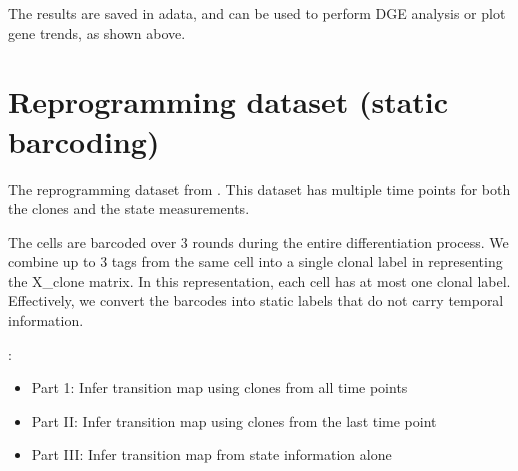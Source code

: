 \documentclass[letterpaper,10pt,english]{sphinxmanual}
\begin{document}
The results are saved in adata, and can be used to perform DGE analysis or plot gene trends, as shown above.


\section{Reprogramming dataset (static barcoding)}
\label{\detokenize{20210121_reprogramming_data_merge_tags:Reprogramming-dataset-(static-barcoding)}}\label{\detokenize{20210121_reprogramming_data_merge_tags::doc}}
The reprogramming dataset from . This dataset has multiple time points for both the clones and the state measurements.

The cells are barcoded over 3 rounds during the entire differentiation process. We combine up to 3 tags from the same cell into a single clonal label in representing the X\_clone matrix. In this representation, each cell has at most one clonal label. Effectively, we convert the barcodes into static labels that do not carry temporal information.

:
\begin{itemize}
\item {} 
Part 1: Infer transition map using clones from all time points

\item {} 
Part II: Infer transition map using clones from the last time point

\item {} 
Part III: Infer transition map from state information alone

\end{itemize}

{
\begin{sphinxVerbatim}[commandchars=\\\{\}]
\llap{\color{nbsphinxin}[1]:\,\hspace{\fboxrule}\hspace{\fboxsep}}   
\end{sphinxVerbatim}
}
\end{document}
